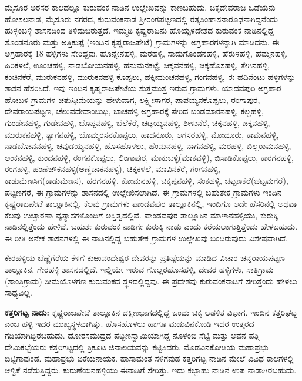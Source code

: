 ಮೈಸೂರ ಅರಸರ ಕಾಲದಲ್ಲೂ ಕುರುವಂಕ ನಾಡಿನ ಉಲ್ಲೇಖವನ್ನು ಕಾಣಬಹುದು. ಚಿಕ್ಕದೇವರಾಜ ಒಡೆಯನು ಹೋಸಲನಾಡ, ಮೈಸೂರು ನಗರದ, ಕುರುವಂಕನಾಡ ಶ‍್ರೀರಂಗಪಟ್ಟಣದಲ್ಲಿ ರತ್ನಸಿಂಹಾಸನಾರೂಢನಾಗಿದ್ದನೆಂದು ಹುಳ್ಳಂಬಳ್ಳಿ ಶಾಸನದಿಂದ ತಿಳಿದುಬರುತ್ತದೆ. ಇಮ್ಮಡಿ ಕೃಷ್ಣರಾಜನು ಹೊಯ್ಸಳದೇಶದ ಕುರುವಂಕ ನಾಡಿನಲ್ಲಿದ್ದ ತೊಂಡನೂರು ಮತ್ತು ಅತ್ತಿಕುಪ್ಪೆ (ಇಂದಿನ ಕೃಷ್ಣರಾಜಪೇಟೆ) ಗ್ರಾಮಗಳನ್ನು ಅಗ್ರಹಾರಗಳನ್ನಾಗಿ ಮಾಡಿದನು. ಈ ಅಗ್ರಹಾರಕ್ಕೆ 18 ಹಳ್ಳಿಗಳು ಸೇರಿದ್ದವು. ಹೊನ್ನೇನಹಳ್ಳಿ, ಮರಹಳ್ಳಿ, ಸಾದುಗೊಂಡನಹಳ್ಳಿ, ಹೆರುಳಹಳ್ಳಿ, ಹೆಮ್ಮನಹಳ್ಳಿ, ಹಿರಿಕಳಲೆ, ಊಂಚಹಳ್ಳಿ, ನಾಡಬೋಯನಹಳ್ಳಿ, ಹನುಮನಕಟ್ಟೆ, ಚಿಕ್ಕವನಹಳ್ಳಿ, ಚಿಕ್ಕಹೊಸಹಳ್ಳಿ, ತೇಗಿನಹಳ್ಳಿ, ಕಂಚಿನಕೆರೆ, ಮುರುಕನಹಳ್ಳಿ, ಮುರುಕನಹಳ್ಳಿ ಕೊಪ್ಪಲು, ಹಕ್ಕೀಮಂಚನಹಳ್ಳಿ, ಗಂಗನಹಳ್ಳಿ, ಈ ಹದಿನೆಂಟು ಹಳ್ಳಿಗಳನ್ನು ಶಾಸನ ಹೆಸರಿಸಿದೆ. ಇವು ಇಂದಿನ ಕೃಷ್ಣರಾಜಪೇಟೆಯ ಸುತ್ತಮುತ್ತ ಇರುವ ಗ್ರಾಮಗಳು. ಯಾದವಪುರಿ ಅಗ್ರಹಾರ ಹೋಬಳಿ ಗ್ರಾಮಗಳ ಚತುಸ್ಸೀಮೆಯನ್ನು ಹೇಳುವಾಗ, ಲಕ್ಷ್ಮೀಸಾಗರ, ಪಾಪಯ್ಯನಕೊಪ್ಪಲು, ರಂಗಾಪುರ, ದೇವರಾಯಪಟ್ಟಣ, ಚೆಲುವದೇವಾಂಬುಧಿ, ಬಾಚಹಳ್ಳಿ ಅಗ್ರಹಾರಕ್ಕೆ ಸೇರಿದ ಬಂಡಮಾರನಹಳ್ಳಿ, ಕಲ್ಲಹಳ್ಳಿ, ಗುಂಡೇನಹಳ್ಳಿ, ಗುಡೇನಹಳ್ಳಿ, ಬೊಪ್ಪನಹಳ್ಳಿ, ಬೆಲೆಕೆರೆ, ಚಟ್ಟಯ್ಯನಹಳ್ಳಿ, ಶೀಳುನೆರೆ, ಚಿಕ್ಕನಹಳ್ಳಿ, ಜಕ್ಕನಹಳ್ಳಿ, ಮುರುಕನಹಳ್ಳಿ, ತ್ಯಾಗನಹಳ್ಳಿ, ಬೊಮ್ಮರಸನಕೊಪ್ಪಲು, ಹಾದನೂರು, ಅಗಸರಹಳ್ಳಿ, ಮೋದೂರು, ಕಾಮನಹಳ್ಳಿ, ನಾಡಬೋವನಹಳ್ಳಿ, ಚವುಡಯ್ಯನಹಳ್ಳಿ, ಹೊಸಹೊಳಲು, ಹೆಂಮನಹಳ್ಳಿ, ನಾಗನಹಳ್ಳಿ, ಮರಹಳ್ಳಿ, ಬಿಲ್ಲರಾಮನಹಳ್ಳಿ, ಅಂಕನಹಳ್ಳಿ, ಕುಂದನಹಳ್ಳಿ, ರಂಗನಕೊಪ್ಪಲು, ಲಿಂಗಾಪುರ, ಮಾಕುಬಳ್ಳಿ(ಮಾಕವಳ್ಳಿ), ಬಿಸಾಡಿಕೊಪ್ಪಲು, ಕಾರಗನಹಳ್ಳಿ, ರಂಗಹಳ್ಳಿ, ಹಂಣೆಚೌಕನಹಳ್ಳಿ(ಅಣ್ಣೆಚಾಕನಹಳ್ಳಿ), ಚಿಕ್ಕಕಳಲೆ, ಮಾವಿನಕೆರೆ, ಗಂಗನಹಳ್ಳಿ, ಕಾಡುಮೆಣಸಿಗೆ(ಕಾಡುಮೆಣಸ), ಹರಗನಹಳ್ಳಿ, ಕೋಮನಹಳ್ಳಿ, ಚಿಕ್ಕಪ್ಪನಹಳ್ಳಿ, ಸಂಕಹಳ್ಳಿ, ಚಟ್ಟಣಕೆರೆ(ಚಟ್ಟಮಗೆರೆ), ಪಟ್ಟಣಗೆರೆ, ಈ ಗ್ರಾಮಗಳನ್ನು ಶಾಸನದಲ್ಲಿ ಉಲ್ಲೇಖಿಸಲಾಗಿದೆ. ಈ ಗ್ರಾಮಗಳಲ್ಲಿ ಬಹುತೇಕ ಗ್ರಾಮಗಳು ಇಂದಿನ ಕೃಷ್ಣರಾಜಪೇಟೆ ತಾಲ್ಲೂಕಿನಲ್ಲಿ, ಕೆಲವು ಗ್ರಾಮಗಳು ಪಾಂಡವಪುರ ತಾಲ್ಲೂಕಿನಲ್ಲಿ, ಇಂದಿಗೂ ಅದೇ ಹೆಸರಿನಲ್ಲಿ ಅಥವಾ ಕೆಲವು ಉಚ್ಛಾರಣಾ ವ್ಯತ್ಯಾಸಗಳೊಂದಿಗೆ ಅಸ್ತಿತ್ವದಲ್ಲಿವೆ. ಪಾಂಡವಪುರ ತಾಲ್ಲೂಕಿನ ಮಾಳಾನಹಳ್ಳಿಯು, ಕುರುಕ್ಕಿ ನಾಡಿನಲ್ಲಿತ್ತೆಂದು ಹೇಳಿದೆ. ಬಹುಶಃ ಕುರುವಂಕ ನಾಡಿಗೇ ಕುರುಕ್ಕಿ ನಾಡು ಎಂದು ಕರೆಯಲಾಗುತ್ತಿತ್ತೆಂದು ಹೇಳಬಹುದು. ಈ ರೀತಿ ಅನೇಕ ಶಾಸನಗಳಲ್ಲಿ ಈ ನಾಡಿನಲ್ಲಿದ್ದ ಬಹುತೇಕ ಗ್ರಾಮಗಳ ಉಲ್ಲೇಖವು ಬಂದಿರುವುದು ವಿಶೇಷವಾಗಿದೆ.

ಕೇರಹಳ್ಳಿಯ ಬೆಣ್ಣೆಗೆರೆಯ ಕೆಳಗೆ ಕುಱುವಂದೇಶ್ವರ ದೇವರನ್ನು ಪ್ರತಿಷ್ಠೆಯನ್ನು ಮಾಡಿದ ವಿಚಾರ ಚನ್ನರಾಯಪಟ್ಟಣ ತಾಲ್ಲೂಕಿನ, ಗೇರಹಳ್ಳಿ ಶಾಸನದಲ್ಲಿದೆ. ಇಲ್ಲಿಯೇ ಇರುವ ಗೊಲ್ಲರಹೊಸಹಳ್ಳಿ, ದೇವರ ಹಳ್ಳಿಗಳು, ಸಾತಿಗ್ರಾಮ (ಶಾಂತಿಗ್ರಾಮ) ಸೀಮೆಯೊಳಗಣ ಕುರುವಂಕದ ಸ್ಥಳದಲ್ಲಿದ್ದವು. ಈ ಪ್ರದೇಶವು ಕುರುವಂಕನಾಡಿಗೆ ಸೇರಿತ್ತೆಂದು ಹೇಳಲು ಸಾಧ್ಯವಿಲ್ಲ.

\textbf{ಕತ್ತರಿಗಟ್ಟ ನಾಡು:} ಕೃಷ್ಣರಾಜಪೇಟೆ ತಾಲ್ಲೂಕಿನ ದಕ್ಷಿಣಭಾಗದಲ್ಲಿದ್ದ ಒಂದು ಚಿಕ್ಕ ಆಡಳಿತ ವಿಭಾಗ. ಇಂದಿನ ಕತ್ತರಿಘಟ್ಟ ಎಂಬ ಹಳ್ಳಿ ಇದರ ಮುಖ್ಯಸ್ಥಳವಾಗಿತ್ತು. ಹೊಸಹೊಳಲು ಹಾಗೂ ಮಡುವಿನಕೋಡಿ ಇದರ ಉತ್ತರದ ಗಡಿಯಾಗಿದ್ದಿರಬಹುದು. ದೋರಸಮುದ್ರದ ಪಟ್ಟಣಸ್ವಾಮಿಯಾಗಿದ್ದ ನೊಳಂಬಿ ಸೆಟ್ಟಿ ಮತ್ತು ಅವನ ಪತ್ನಿ ದೇಮಿಕಬ್ಬೆಯರು ಕತ್ತರಿಗಟ್ಟದಲ್ಲಿ ತ್ರಿಕೂಟ ಜಿನಾಲಯವನ್ನು ಕಟ್ಟಿಸಿದರು. ಮೊಡವಿನಕೋಡಿಯ ಮಹಾಪ್ರಭು ಬಿಟ್ಟಿಗಾವುಂಡ. ಮಹಾಪ್ರಭು ಬಿಕೆಯನಾಯಕ. ಹಾಸಾಮಂತ ಸಳಿಗವುಡ ಕತ್ತರಿಗಟ್ಟ ನಾಡಿನ ಮೇಲೆ ವಿವಿಧ ಕಾಲಗಳಲ್ಲಿ ಆಳ್ವಿಕೆ ನಡೆಸುತ್ತಿದ್ದರು. ಕುರುಣೆಯನಹಳ್ಳಿಯು ಈ\break ನಾಡಿಗೆ ಸೇರಿತ್ತು. ಇದು ಕಬ್ಬಾಹು ನಾಡಿನ ಉಪ ನಾಡಾಗಿರಬಹುದು.

